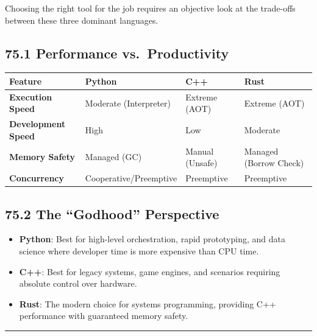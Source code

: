 Choosing the right tool for the job requires an objective look at the
trade-offs between these three dominant languages.

\hypertarget{performance-vs.-productivity}{%
\subsection{75.1 Performance
vs.~Productivity}\label{performance-vs.-productivity}}

\begin{longtable}[]{@{}llll@{}}
\toprule
Feature & Python & C++ & Rust \\
\midrule
\endhead
\textbf{Execution Speed} & Moderate (Interpreter) & Extreme (AOT) &
Extreme (AOT) \\
\textbf{Development Speed} & High & Low & Moderate \\
\textbf{Memory Safety} & Managed (GC) & Manual (Unsafe) & Managed
(Borrow Check) \\
\textbf{Concurrency} & Cooperative/Preemptive & Preemptive &
Preemptive \\
\bottomrule
\end{longtable}

\hypertarget{the-godhood-perspective}{%
\subsection{75.2 The ``Godhood''
Perspective}\label{the-godhood-perspective}}

\begin{itemize}
\tightlist
\item
  \textbf{Python}: Best for high-level orchestration, rapid prototyping,
  and data science where developer time is more expensive than CPU time.
\item
  \textbf{C++}: Best for legacy systems, game engines, and scenarios
  requiring absolute control over hardware.
\item
  \textbf{Rust}: The modern choice for systems programming, providing
  C++ performance with guaranteed memory safety.
\end{itemize}

\begin{center}\rule{0.5\linewidth}{0.5pt}\end{center}
